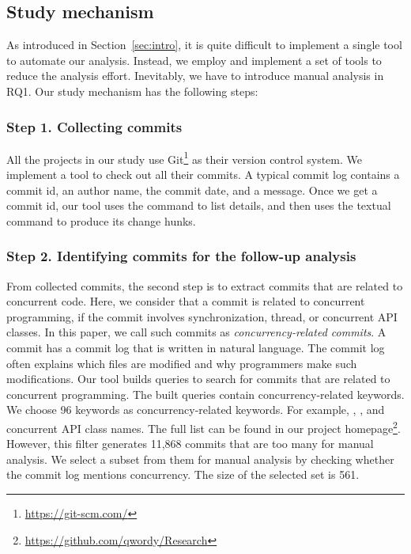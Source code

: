 \subsection{Study mechanism}
\label{sec:method:tool}
As introduced in Section~\ref{sec:intro}, it is quite difficult to implement a single tool to automate our analysis. Instead, we employ and implement a set of tools to reduce the analysis effort. Inevitably, we have to introduce manual analysis in RQ1. Our study mechanism has the following steps:

\subsubsection{Step 1. Collecting commits} All the projects in our study use Git\footnote{\url{https://git-scm.com/}} as their version control system. We implement a tool to check out all their commits. A typical commit log contains a commit id, an author name, the commit date, and a message. Once we get a commit id, our tool uses the  command to list details, and then uses the textual  command to produce its change hunks.

\subsubsection{Step 2. Identifying commits for the follow-up analysis} From collected commits, the second step is to extract commits that are related to concurrent code. Here, we consider that a commit is related to concurrent programming, if the commit involves synchronization, thread, or concurrent API classes. In this paper, we call such commits as \emph{concurrency-related commits}. A commit has a commit log that is written in natural language. The commit log often explains which files are modified and why programmers make such modifications. Our tool builds queries to search for commits that are related to concurrent programming. The built queries contain concurrency-related keywords. We choose 96 keywords as concurrency-related keywords. For example, , , and concurrent API class names. The full list can be found in our project homepage\footnote{\url{https://github.com/qwordy/Research}}. However, this filter generates 11,868 commits that are too many for manual analysis. We select a subset from them for manual analysis by checking whether the commit log mentions concurrency. The size of the selected set is 561.

